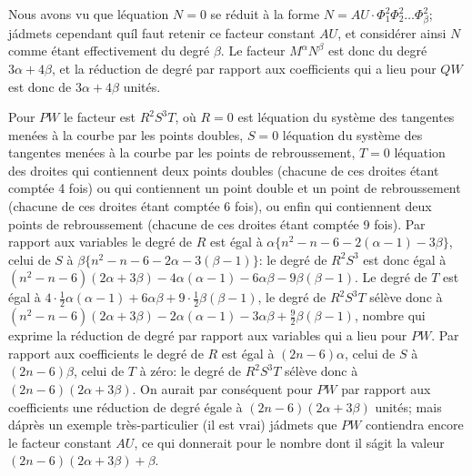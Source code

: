 \documentclass[11pt,a4paper]{article}
\theoremstyle{plain}
\begin{document}
Nous avons vu que l\'equation $N=0$ se r\'eduit \`a la forme $N = AU \cdot \Phi_1^2 \Phi_2^2 \ldots \Phi_\beta^2$; j\'admets cependant qu\'il faut retenir ce facteur constant $AU$, et consid\'erer ainsi $N$ comme \'etant effectivement du degr\'e $\beta$. Le facteur $M^\alpha N^\beta$ est donc du degr\'e $3\alpha + 4\beta$, et la r\'eduction de degr\'e par rapport aux coefficients qui a lieu pour $QW$ est donc de $3\alpha + 4\beta$ unit\'es.

Pour $PW$ le facteur est $R^2S^3T$, o\`u $R=0$ est l\'equation du syst\`eme des tangentes men\'ees \`a la courbe par les points doubles, $S=0$ l\'equation du syst\`eme des tangentes men\'ees \`a la courbe par les points de rebroussement, $T=0$ l\'equation des droites qui contiennent deux points doubles (chacune de ces droites \'etant compt\'ee 4 fois) ou qui contiennent un point double et un point de rebroussement (chacune de ces droites \'etant compt\'ee 6 fois), ou enfin qui contiennent deux points de rebroussement (chacune de ces droites \'etant compt\'ee 9 fois). Par rapport aux variables le degr\'e de $R$ est \'egal \`a $\alpha\{n^2-n-6-2(\alpha-1)-3\beta\}$, celui de $S$ \`a $\beta\{n^2-n-6-2\alpha-3(\beta-1)\}$: le degr\'e de $R^2S^3$ est donc \'egal \`a $(n^2-n-6)(2\alpha+3\beta) - 4\alpha(\alpha-1) - 6\alpha\beta - 9\beta(\beta-1)$. Le degr\'e de $T$ est \'egal \`a $4\cdot\tfrac{1}{2}\alpha(\alpha-1) + 6\alpha\beta + 9\cdot\tfrac{1}{2}\beta(\beta-1)$, le degr\'e de $R^2S^3T$ s\'el\`eve donc \`a $(n^2-n-6)(2\alpha+3\beta) - 2\alpha(\alpha-1) - 3\alpha\beta + \tfrac{9}{2}\beta(\beta-1)$, nombre qui exprime la r\'eduction de degr\'e par rapport aux variables qui a lieu pour $PW$. Par rapport aux coefficients le degr\'e de $R$ est \'egal \`a $(2n-6)\alpha$, celui de $S$ \`a $(2n-6)\beta$, celui de $T$ \`a z\'ero: le degr\'e de $R^2S^3T$ s\'el\`eve donc \`a $(2n-6)(2\alpha+3\beta)$. On aurait par cons\'equent pour $PW$ par rapport aux coefficients une r\'eduction de degr\'e \'egale \`a $(2n-6)(2\alpha+3\beta)$ unit\'es; mais d\'apr\`es un exemple tr\`es-particulier (il est vrai) j\'admets que $PW$ contiendra encore le facteur constant $AU$, ce qui donnerait pour le nombre dont il s\'agit la valeur $(2n-6)(2\alpha+3\beta) + \beta$.
\end{document}
